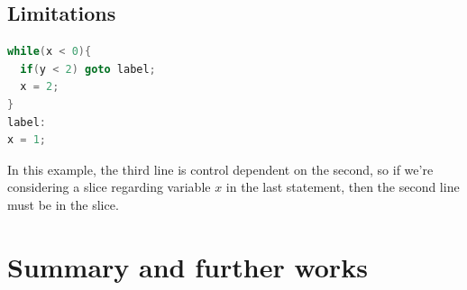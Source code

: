 \documentclass[oneside,12pt,a4paper]{book}
\begin{document}
\subsection{Limitations}

\begin{lstlisting}[language=C++]
while(x < 0){
  if(y < 2) goto label; 
  x = 2;
}
label:
x = 1;
\end{lstlisting}

In this example, the third line is control dependent on the second, so if we're considering a slice regarding variable $x$ in the last statement, then the second line must be in the slice.



\section{Summary and further works}
\end{document}
